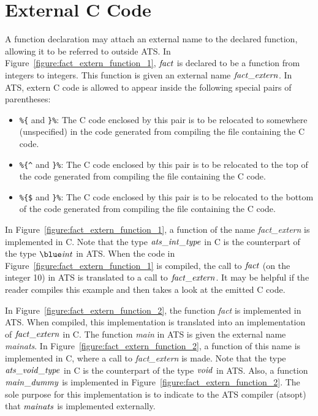 \section{External C Code}
A function declaration may attach an external name to the declared
function, allowing it to be referred to outside ATS. In
Figure~\ref{figure:fact_extern_function_1}, ${\it fact}$ is declared to
be a function from integers to integers.  This function is given an
external name ${\it fact\_extern}$.  In ATS, extern C code is allowed to
appear inside the following special pairs of parentheses:
\begin{itemize}
\item \verb`%{` and \verb`}%`: The C code enclosed by this pair is to be
relocated to somewhere (unspecified) in the code generated from compiling
the file containing the C code.
\item \verb`%{^` and \verb`}%`:
The C code enclosed by this pair is to be relocated to the top of the
code generated from compiling the file containing the C code.
\item \verb`%{$` and \verb`}%`:
The C code enclosed by this pair is to be relocated to the bottom of the
code generated from compiling the file containing the C code.
\end{itemize}
In Figure~\ref{figure:fact_extern_function_1}, a function of the name {\it
fact\_extern} is implemented in C. Note that the type ${\it
ats\_int\_type}$ in C is the counterpart of the type $\tint$ in ATS.  When
the code in Figure~\ref{figure:fact_extern_function_1} is compiled, the
call to ${\it fact}$ (on the integer 10) in ATS is translated to a call to
${\it fact\_extern}$. It may be helpful if the reader compiles this example
and then takes a look at the emitted C code.

In Figure~\ref{figure:fact_extern_function_2}, the function {\it fact} is
implemented in ATS. When compiled, this implementation is translated into
an implementation of ${\it fact\_extern}$ in C.  The function {\it main} in
ATS is given the external name {\it mainats}.  In
Figure~\ref{figure:fact_extern_function_2}, a function of this name is
implemented in C, where a call to {\it fact\_extern} is made. Note that the
type ${\it ats\_void\_type}$ in C is the counterpart of the type ${\it
void}$ in ATS.  Also, a function ${\it main\_dummy}$ is implemented in
Figure~\ref{figure:fact_extern_function_2}.  The sole purpose for this
implementation is to indicate to the ATS compiler (atsopt) that ${\it
mainats}$ is implemented externally.

